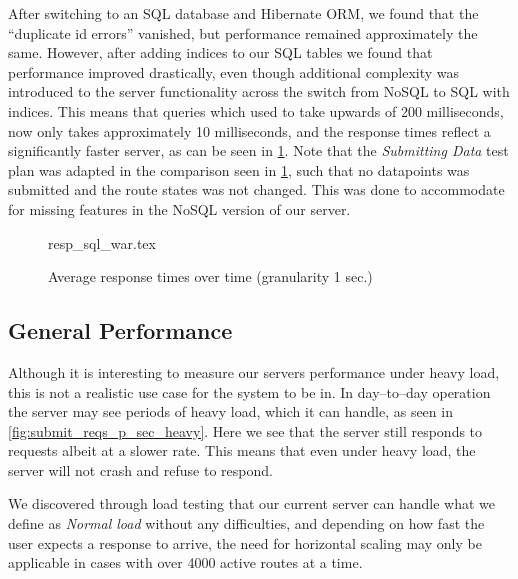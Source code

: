 After switching to an SQL database and Hibernate ORM, we found that the \enquote{duplicate id errors} vanished, but performance remained approximately the same.
However, after adding indices to our SQL tables we found that performance improved drastically, even though additional complexity was introduced to the server functionality across the switch from NoSQL to SQL with indices.
This means that queries which used to take upwards of 200 milliseconds, now only takes approximately 10 milliseconds, and the response times reflect a significantly faster server, as can be seen in \cref{fig:nosql_vs_sql}.
Note that the \textit{Submitting Data} test plan was adapted in the comparison seen in \cref{fig:nosql_vs_sql}, such that no datapoints was submitted and the route states was not changed.
This was done to accommodate for missing features in the NoSQL version of our server.

\begin{figure}[!htb]
    \centering
    \footnotesize
    {resp_sql_war.tex}
    \caption{Average response times over time (granularity 1 sec.)}\label{fig:nosql_vs_sql}
\end{figure}

\subsection{General Performance}
Although it is interesting to measure our servers performance under heavy load, this is not a realistic use case for the system to be in.
In day--to--day operation the server may see periods of heavy load, which it can handle, as seen in \cref{fig:submit_reqs_p_sec_heavy}. %
Here we see that the server still responds to requests albeit at a slower rate.
This means that even under heavy load, the server will not crash and refuse to respond.

We discovered through load testing that our current server can handle what we define as \textit{Normal load} without any difficulties, and depending on how fast the user expects a response to arrive, the need for horizontal scaling may only be applicable in cases with over 4000 active routes at a time.
